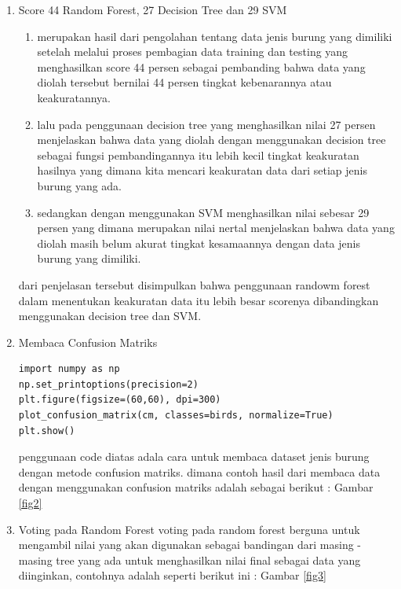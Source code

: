 \begin{enumerate}
\item Score 44 Random Forest, 27 Decision Tree dan 29 SVM
\begin{enumerate}
\item
merupakan hasil dari pengolahan tentang data jenis burung yang dimiliki setelah melalui proses pembagian data training dan testing yang menghasilkan score 44 persen sebagai pembanding bahwa data yang diolah tersebut bernilai 44 persen tingkat kebenarannya atau keakuratannya.
\item
lalu pada penggunaan decision tree yang menghasilkan nilai 27 persen menjelaskan bahwa data yang diolah dengan menggunakan decision tree sebagai fungsi pembandingannya itu lebih kecil tingkat keakuratan hasilnya yang dimana kita mencari keakuratan data dari setiap jenis burung yang ada.
\item
sedangkan dengan menggunakan SVM menghasilkan nilai sebesar 29 persen yang dimana merupakan nilai nertal menjelaskan bahwa data yang diolah masih belum akurat tingkat kesamaannya dengan data jenis burung yang dimiliki.
\end{enumerate}
dari penjelasan tersebut disimpulkan bahwa penggunaan randowm forest dalam menentukan keakuratan data itu lebih besar scorenya dibandingkan menggunakan decision tree dan SVM.

\item Membaca Confusion Matriks
\begin{verbatim}
import numpy as np
np.set_printoptions(precision=2)
plt.figure(figsize=(60,60), dpi=300)
plot_confusion_matrix(cm, classes=birds, normalize=True)
plt.show()
\end{verbatim}
penggunaan code diatas adala cara untuk membaca dataset jenis burung dengan metode confusion matriks. dimana contoh hasil dari membaca data dengan menggunakan confusion matriks adalah sebagai berikut : Gambar \ref{fig2}

\item Voting pada Random Forest
voting pada random forest berguna untuk mengambil nilai yang akan digunakan sebagai bandingan dari masing - masing tree yang ada untuk menghasilkan nilai final sebagai data yang diinginkan, contohnya adalah seperti berikut ini : Gambar \ref{fig3}
\end{enumerate}

